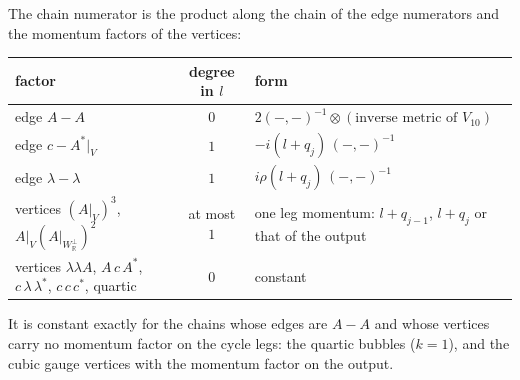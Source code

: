 \begin{remark}
\label{rem:c10-numerator}
The chain numerator is the product along the chain of the edge numerators and the momentum factors of the vertices:

\begin{tabular}{l|c|l}
factor & degree in $l$ & form\\
\hline
edge $A-A$ & $0$ & $2(-,-)^{-1}\otimes(\text{inverse metric of }V_{10})$\\
edge $c-A^*|_V$ & $1$ & $-i(l+q_j)\,(-,-)^{-1}$\\
edge $\lambda-\lambda$ & $1$ & $i\rho(l+q_j)\,(-,-)^{-1}$\\
vertices $(A|_V)^3$, $A|_V(A|_{W_{\mathbb R}^\perp})^2$ & at most $1$ & one leg momentum: $l+q_{j-1}$, $l+q_j$ or that of the output\\
vertices $\lambda\lambda A$, $A\,c\,A^*$, $c\,\lambda\,\lambda^*$, $c\,c\,c^*$, quartic & $0$ & constant\\
\end{tabular}

It is constant exactly for the chains whose edges are $A-A$ and whose vertices carry no momentum factor on the cycle legs: the quartic bubbles ($k=1$), and the cubic gauge vertices with the momentum factor on the output.
\end{remark}

